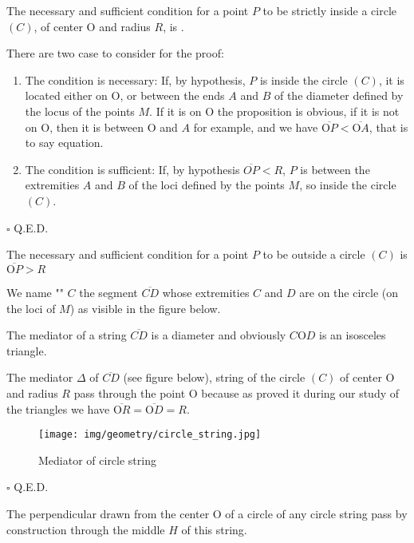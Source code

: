 	\begin{theorem}
	The necessary and sufficient condition for a point $P$ to be strictly inside a circle $(C)$, of center O and radius $R$, is .
	\end{theorem}
	\begin{dem}
	There are two case to consider for the proof:
	\begin{enumerate}
		\item The condition is necessary: If, by hypothesis, $P$ is inside the circle $(C)$, it is located either on O, or between the ends $A$ and $B$ of the diameter defined by the locus of the points $M$. If it is on O the proposition is obvious, if it is not on O, then it is between O and $A$ for example, and we have $\overline{\text{O}P}<\overline{\text{O}A}$, that is to say equation.

		\item The condition is sufficient: If, by hypothesis $\overline{OP}<R$, $P$ is between the extremities $A$ and $B$ of the loci defined by the points $M$, so inside the circle $(C)$.
	\end{enumerate}
	\begin{flushright}
		$\square$  Q.E.D.
	\end{flushright}
	\end{dem}
	\begin{corollary}
	The necessary and sufficient condition for a point $P$ to be outside a circle $(C)$ is $\overline{\text{O}P}>R$
	\end{corollary}
	
	We name "" $C$ the segment  $\overline{CD}$ whose extremities $C$ and $D$ are on the circle (on the loci of $M$) as visible in the figure below.

	\begin{theorem}
	The mediator of a string $\overline{CD}$ is a diameter and obviously $C\text{O}D$ is an isosceles triangle.
	\end{theorem}
	\begin{dem}
	The mediator $\Delta$ of $\overline{CD}$ (see figure below), string of the circle $(C)$ of center O and radius $R$ pass through the point O because as proved it during our study of the triangles we have $\overline{\text{O}R}=\overline{\text{O}D}=R$.
	\begin{figure}[H]
		\centering
		\texttt{[image: img/geometry/circle\_string.jpg]}
		\caption[]{Mediator of circle string}
	\end{figure}
	\begin{flushright}
		$\square$  Q.E.D.
	\end{flushright}
	\end{dem}
	\begin{corollary}
	The perpendicular drawn from the center O of a circle of any circle string pass by construction through the middle $H$ of this string.
	\end{corollary}
	
